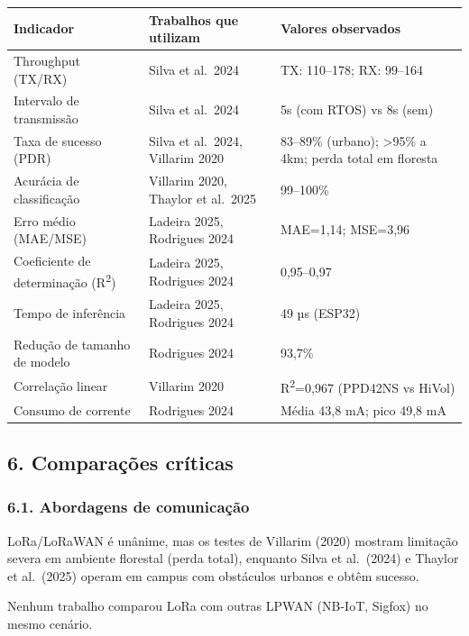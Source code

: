 \documentclass[12pt,a4paper]{article}
\begin{document}
\begin{table}[H]
\centering
\small
\begin{tabularx}{\textwidth}{|p{3.5cm}|p{4cm}|X|}
\hline
\textbf{Indicador} & \textbf{Trabalhos que utilizam} & \textbf{Valores observados} \\
\hline
Throughput (TX/RX) & Silva et al.\ 2024 & TX: 110–178; RX: 99–164 \\
\hline
Intervalo de transmissão & Silva et al.\ 2024 & 5s (com RTOS) vs 8s (sem) \\
\hline
Taxa de sucesso (PDR) & Silva et al.\ 2024, Villarim 2020 & 83–89\% (urbano); >95\% a 4km; perda total em floresta \\
\hline
Acurácia de classificação & Villarim 2020, Thaylor et al.\ 2025 & 99–100\% \\
\hline
Erro médio (MAE/MSE) & Ladeira 2025, Rodrigues 2024 & MAE=1,14; MSE=3,96 \\
\hline
Coeficiente de determinação (R\textsuperscript{2}) & Ladeira 2025, Rodrigues 2024 & 0,95–0,97 \\
\hline
Tempo de inferência & Ladeira 2025, Rodrigues 2024 & 49 µs (ESP32) \\
\hline
Redução de tamanho de modelo & Rodrigues 2024 & 93,7\% \\
\hline
Correlação linear & Villarim 2020 & R\textsuperscript{2}=0,967 (PPD42NS vs HiVol) \\
\hline
Consumo de corrente & Rodrigues 2024 & Média 43,8 mA; pico 49,8 mA \\
\hline
\end{tabularx}
\end{table}

\subsection*{6. Comparações críticas}

\subsubsection*{6.1. Abordagens de comunicação}

LoRa/LoRaWAN é unânime, mas os testes de Villarim (2020) mostram limitação severa em ambiente florestal (perda total), enquanto Silva et al.\ (2024) e Thaylor et al.\ (2025) operam em campus com obstáculos urbanos e obtêm sucesso.

Nenhum trabalho comparou LoRa com outras LPWAN (NB-IoT, Sigfox) no mesmo cenário.
\end{document}
